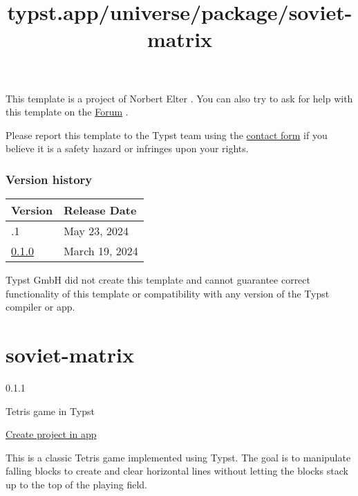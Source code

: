 This template is a project of Norbert Elter . You can also try to ask
for help with this template on the \href{https://forum.typst.app}{Forum}
.

Please report this template to the Typst team using the
\href{https://typst.app/contact}{contact form} if you believe it is a
safety hazard or infringes upon your rights.

\label{versions}
\subsubsection{Version history}\label{version-history}

\begin{longtable}[]{@{}ll@{}}
\toprule\noalign{}
Version & Release Date \\
\midrule\noalign{}
\endhead
\bottomrule\noalign{}
\endlastfoot
0.1.1 & May 23, 2024 \\
\href{https://typst.app/universe/package/minimalistic-latex-cv/0.1.0/}{0.1.0}
& March 19, 2024 \\
\end{longtable}

Typst GmbH did not create this template and cannot guarantee correct
functionality of this template or compatibility with any version of the
Typst compiler or app.


\title{typst.app/universe/package/soviet-matrix}

\label{banner}
\label{template-thumbnail}

\section{soviet-matrix}\label{soviet-matrix}

{ 0.1.1 }

Tetris game in Typst

\href{/app?template=soviet-matrix&version=0.1.1}{Create project in app}

\label{readme}
This is a classic Tetris game implemented using Typst. The goal is to
manipulate falling blocks to create and clear horizontal lines without
letting the blocks stack up to the top of the playing field.


